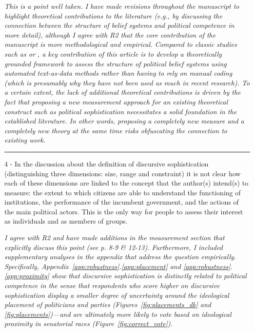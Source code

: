 \textit{This is a point well taken. I have made revisions throughout the manuscript to highlight theoretical contributions to the literature (e.g., by discussing the connection between the structure of belief systems and political competence in more detail), although I agree with R2 that the core contribution of the manuscript is more methodological and empirical. Compared to classic studies such as \citet{converse1964nature} or \citet{luskin1987measuring}, a key contribution of this article is to develop a theoretically grounded framework to assess the structure of political belief systems using automated text-as-data methods rather than having to rely on manual coding (which is presumably why they have not been used as much in recent research). To a certain extent, the lack of additional theoretical contributions is driven by the fact that proposing a new measurement approach for an existing theoretical construct such as political sophistication necessitates a solid foundation in the established literature. In other words, proposing a completely new measure {\normalfont and} a completely new theory at the same time risks obfuscating the connection to existing work.}


\rule{\linewidth}{.01cm}

4 - In the discussion about the definition of discursive sophistication (distinguishing three dimensions: size, range and constraint) it is not clear how each of these dimensions are linked to the concept that the author(s) intend(s) to measure: the extent to which citizens are able to understand the functioning of institutions, the performance of the incumbent government, and the actions of the main political actors. This is the only way for people to assess their interest as individuals and as members of groups.

\textit{I agree with R2 and have made additions in the measurement section that explicitly discuss this point (see p. 8-9 \& 12-13). Furthermore, I included supplementary analyses in the appendix that address the question empirically. Specifically, Appendix~\ref{app:robustness}.\ref{app:placement} and \ref{app:robustness}.\ref{app:proximity} show that discursive sophistication is distinctly related to political competence in the sense that respondents who score higher on discursive sophistication display a smaller degree of uncertainty around the ideological placement of politicians and parties (Figures~\ref{fig:placements_dk} and \ref{fig:placements})---and are ultimately more likely to vote based on ideological proximity in senatorial races (Figure~\ref{fig:correct_vote}).}

